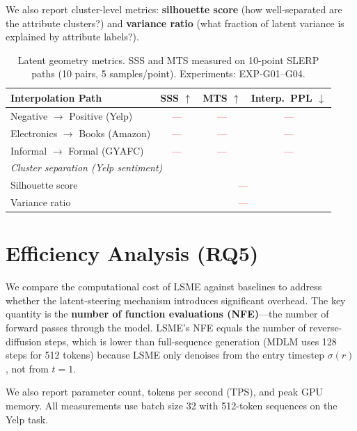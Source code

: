 \documentclass{article}
\newcommand{\tbd}[1]{\textcolor{red}{#1}}  %
\begin{document}
We also report cluster-level metrics: \textbf{silhouette score} (how well-separated are the attribute clusters?) and \textbf{variance ratio} (what fraction of latent variance is explained by attribute labels?).

\begin{table}[h]
\centering
\caption{Latent geometry metrics. SSS and MTS measured on 10-point SLERP paths (10 pairs, 5 samples/point). Experiments: EXP-G01--G04.}
\label{tab:geometry}
\begin{tabular}{lccc}
\toprule
\textbf{Interpolation Path} & \textbf{SSS $\uparrow$} & \textbf{MTS $\uparrow$} & \textbf{Interp.\ PPL $\downarrow$} \\
\midrule
Negative $\to$ Positive (Yelp) & \tbd{---} & \tbd{---} & \tbd{---} \\
Electronics $\to$ Books (Amazon) & \tbd{---} & \tbd{---} & \tbd{---} \\
Informal $\to$ Formal (GYAFC) & \tbd{---} & \tbd{---} & \tbd{---} \\
\midrule
\multicolumn{4}{l}{\textit{Cluster separation (Yelp sentiment)}} \\
Silhouette score & \multicolumn{3}{c}{\tbd{---}} \\
Variance ratio & \multicolumn{3}{c}{\tbd{---}} \\
\bottomrule
\end{tabular}
\end{table}

\section{Efficiency Analysis (RQ5)}
\label{sec:efficiency}

We compare the computational cost of LSME against baselines to address whether the latent-steering mechanism introduces significant overhead. The key quantity is the \textbf{number of function evaluations (NFE)}---the number of forward passes through the model. LSME's NFE equals the number of reverse-diffusion steps, which is lower than full-sequence generation (MDLM uses 128 steps for 512 tokens) because LSME only denoises from the entry timestep $\sigma(r)$, not from $t = 1$.

We also report parameter count, tokens per second (TPS), and peak GPU memory. All measurements use batch size 32 with 512-token sequences on the Yelp task.
\end{document}
